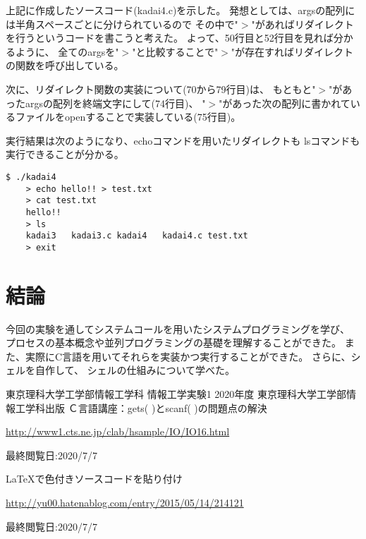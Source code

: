 \documentclass[12pt]{jarticle}
\begin{document}
\clearpage
上記に作成したソースコード(kadai4.c)を示した。
発想としては、argsの配列には半角スペースごとに分けられているので
その中で"$>$"があればリダイレクトを行うというコードを書こうと考えた。
よって、50行目と52行目を見れば分かるように、
全てのargsを"$>$"と比較することで"$>$"が存在すればリダイレクトの関数を呼び出している。

次に、リダイレクト関数の実装について(70から79行目)は、
もともと"$>$"があったargsの配列を終端文字にして(74行目)、
"$>$"があった次の配列に書かれているファイルをopenすることで実装している(75行目)。

実行結果は次のようになり、echoコマンドを用いたリダイレクトも
lsコマンドも実行できることが分かる。

\begin{lstlisting}[style = lstbash]
    $ ./kadai4
    > echo hello!! > test.txt
    > cat test.txt
    hello!!
    > ls
    kadai3   kadai3.c kadai4   kadai4.c test.txt
    > exit
\end{lstlisting}
\section{結論}

今回の実験を通してシステムコールを用いたシステムプログラミングを学び、
プロセスの基本概念や並列プログラミングの基礎を理解することができた。
また、実際にC言語を用いてそれらを実装かつ実行することができた。
さらに、シェルを自作して、
シェルの仕組みについて学べた。

\begin{thebibliography}{99}
    \label{sannkoubunnkenn_chapter}
    東京理科大学工学部情報工学科 情報工学実験1 2020年度
    東京理科大学工学部情報工学科出版
    Ｃ言語講座：gets( )とscanf( )の問題点の解決

    \url{http://www1.cts.ne.jp/clab/hsample/IO/IO16.html}

    最終閲覧日:2020/7/7

    LaTeXで色付きソースコードを貼り付け

    \url{http://yu00.hatenablog.com/entry/2015/05/14/214121}

    最終閲覧日:2020/7/7

\end{thebibliography}

\clearpage
\appendix
\end{document}
